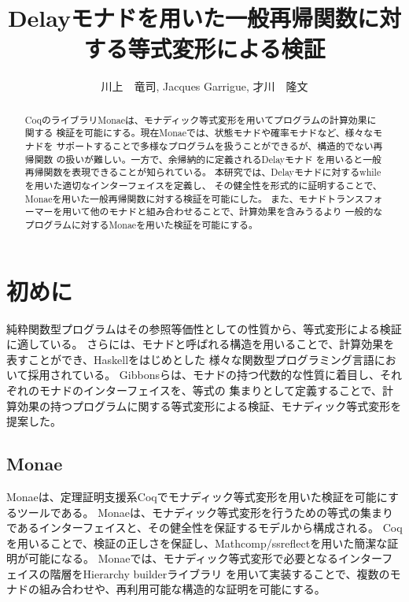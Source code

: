 \documentclass[japanese]{jssst_ppl}
\title{Delayモナドを用いた一般再帰関数に対する等式変形による検証}
\author{川上　竜司, Jacques Garrigue, 才川　隆文}
\theoremstyle{definition}
\begin{document}
\maketitle
\begin{abstract}
  CoqのライブラリMonaeは、モナディック等式変形を用いてプログラムの計算効果に関する
  検証を可能にする。現在Monaeでは、状態モナドや確率モナドなど、様々なモナドを
  サポートすることで多様なプログラムを扱うことができるが、構造的でない再帰関数
  の扱いが難しい。一方で、余帰納的に定義されるDelayモナド
  を用いると一般再帰関数を表現できることが知られている。
  本研究では、Delayモナドに対するwhileを用いた適切なインターフェイスを定義し、
  その健全性を形式的に証明することで、Monaeを用いた一般再帰関数に対する検証を可能にした。
  また、モナドトランスフォーマーを用いて他のモナドと組み合わせることで、計算効果を含みうるより
  一般的なプログラムに対するMonaeを用いた検証を可能にする。
\end{abstract}

\section{初めに}
純粋関数型プログラムはその参照等価性としての性質から、等式変形による検証に適している。
さらには、モナドと呼ばれる構造を用いることで、計算効果を表すことができ、Haskellをはじめとした
様々な関数型プログラミング言語において採用されている。
Gibbonsらは、モナドの持つ代数的な性質に着目し、それぞれのモナドのインターフェイスを、等式の
集まりとして定義することで、計算効果の持つプログラムに関する等式変形による検証、モナディック等式変形を
提案した\cite{10.1145/2034574.2034777}。

\subsection{Monae}
Monae\cite{monae}は、定理証明支援系Coqでモナディック等式変形を用いた検証を可能にするツールである。
Monaeは、モナディック等式変形を行うための等式の集まりであるインターフェイスと、その健全性を保証するモデルから構成される。
Coqを用いることで、検証の正しさを保証し、Mathcomp/ssreflectを用いた簡潔な証明が可能になる。
Monaeでは、モナディック等式変形で必要となるインターフェイスの階層をHierarchy builderライブラリ\cite{cohen:hal-02478907}
を用いて実装することで、複数のモナドの組み合わせや、再利用可能な構造的な証明を可能にする。
\end{document}
